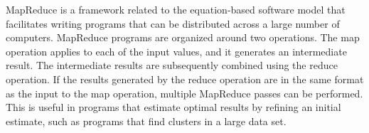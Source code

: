 MapReduce is a framework related 
to the equation-based software model that facilitates writing
programs that can be distributed across a large number of computers.
MapReduce programs are organized around two operations.
The map operation applies to each of the input values, and
it generates an intermediate result.
The intermediate results are subsequently combined using the reduce operation.
If the results generated by the reduce operation are in the same format
as the input to the map operation, multiple MapReduce passes can be performed.
This is useful in programs that estimate optimal results by refining an initial estimate,
such as programs that find clusters in a large data set.

